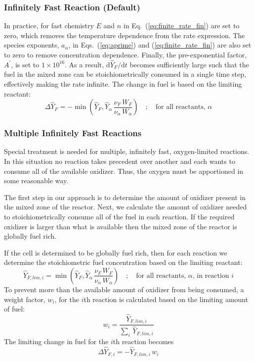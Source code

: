 \subsubsection{Infinitely Fast Reaction (Default)}
In practice, for fast chemistry $E$ and $n$ in Eq.~(\ref{eq:finite_rate_fin}) are set to zero, which removes the temperature dependence from the rate expression. The species exponents, $a_{\alpha}$, in Eqs.~(\ref{eq:aprime}) and (\ref{eq:finite_rate_fin}) are also set to zero to remove concentration dependence. Finally, the pre-exponential factor, $A^{\prime}$, is set to $1 \times 10^{16}$. As a result, $\mbox{d}\hat{Y}_F/\mbox{d}t$ becomes sufficiently large such that the fuel in the mixed zone can be stoichiometrically consumed in a single time step, effectively making the rate infinite. The change in fuel is based on the limiting reactant:
\begin{equation}\label{eq:stoich_fuel_single}
\Delta \hat{Y}_{F} = - \min \left( \hat{Y}_F, \hat{Y}_{\alpha} \,\frac{\nu_{F}\,W_{F}}{\nu_{\alpha}\,W_{\alpha}}\right) \quad ; \quad \mbox{for all reactants, $\alpha$}
\end{equation}

\subsubsection{Multiple Infinitely Fast Reactions}
Special treatment is needed for multiple, infinitely fast, oxygen-limited reactions. In this situation no reaction takes precedent over another and each wants to consume all of the available oxidizer.  Thus, the oxygen must be apportioned in some reasonable way.

The first step in our approach is to determine the amount of oxidizer present in the mixed zone of the reactor. Next, we calculate the amount of oxidizer needed to stoichiometrically consume all of the fuel in each reaction. If the required oxidizer is larger than what is available then the mixed zone of the reactor is globally fuel rich.

If the cell is determined to be globally fuel rich, then for each reaction we determine the stoichiometric fuel concentration based on the limiting reactant:
\begin{equation}\label{eq:stoich_fuel}
\hat{Y}_{F,lim,i} = \min \left( \hat{Y}_F, \hat{Y}_{\alpha} \,\frac{\nu_{F}\,W_{F}}{\nu_{\alpha}\,W_{\alpha}} \right) \quad ; \quad \mbox{for all reactants, $\alpha$, in reaction $i$}
\end{equation}
To prevent more than the available amount of oxidizer from being consumed, a weight factor, $w_i$, for the $i$th reaction is calculated based on the limiting amount of fuel:
\begin{equation}\label{eq:fuel_weight}
w_i = \frac{\hat{Y}_{F,lim,i}}{\sum_i \, \hat{Y}_{F,lim,i}}
\end{equation}
The limiting change in fuel for the $i$th reaction becomes
\begin{equation}\label{eq:fuel_rate}
\Delta \hat{Y}_{F,i} = -\hat{Y}_{F,lim,i}\,w_i
\end{equation}

